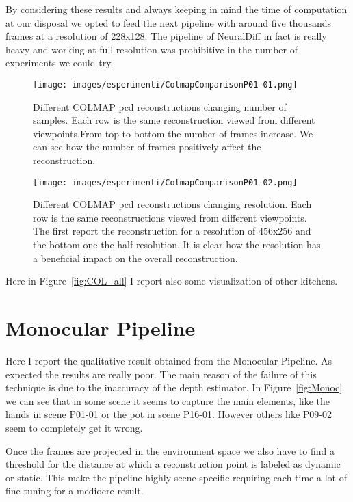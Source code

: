 By considering these results and always keeping in mind the time of computation at our disposal
we opted to feed the next pipeline with around five thousands frames at a resolution 
of 228x128. The pipeline of NeuralDiff in fact is really heavy and working at full resolution
was prohibitive in the number of experiments we could try.


\begin{figure}[H]
    \centering
    \texttt{[image: images/esperimenti/ColmapComparisonP01-01.png]} 
    \caption{Different COLMAP pcd reconstructions changing number of samples. 
    Each row is the same reconstruction viewed from different viewpoints.From top to bottom the number of frames increase. We can see
    how the number of frames positively affect the reconstruction.}\label{fig:colmap_P01_frames}
\end{figure}
\begin{figure}[H]
    \centering
    \texttt{[image: images/esperimenti/ColmapComparisonP01-02.png]} 
    \caption{Different COLMAP pcd reconstructions changing
    resolution. Each row is the same reconstructions viewed from different viewpoints. The first report 
    the reconstruction for a resolution of 456x256 and the bottom one the half resolution. It is clear 
    how the resolution has a beneficial impact on the overall reconstruction.}\label{fig:colmap_P01_res}
\end{figure}
Here in Figure~\ref{fig:COL_all} I report also some visualization of other kitchens.

\section{Monocular Pipeline}
Here I report the qualitative result obtained from the Monocular Pipeline. As expected the results are really poor.
The main reason of the failure of this technique is due to the inaccuracy of the depth estimator. In Figure~\ref{fig:Monoc} we can see
that in some scene it seems to capture the main elements, like the hands in scene  P01-01 or the pot in scene P16-01. However others like P09-02 seem
to completely get it wrong.

Once the frames are 
projected in the environment space we also have to find a threshold for the distance at which a reconstruction point is labeled as 
dynamic or static. This make the pipeline highly scene-specific requiring each time a lot of fine tuning for a mediocre result.

